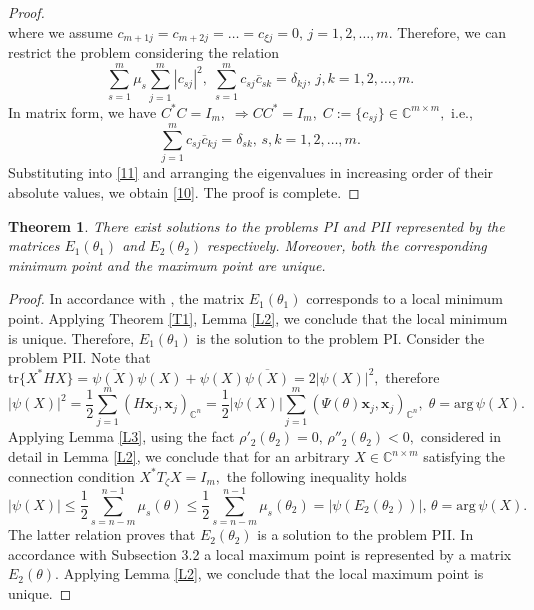 \documentclass[a4paper,twoside,12pt]{article}
\newtheorem{theorem}{Theorem}
\begin{document}
\begin{proof}
$$$$
where we assume  $c_{m+1j}=c_{m+2j}=\ldots=c_{\xi j}=0,\,j=1,2,\ldots,m.$
Therefore, we can restrict the problem considering the   relation
\begin{equation}\label{11}
      \sum\limits_{s=1}^{m}\mu_{s} \sum\limits_{j=1}^{m}  |c_{sj }|^{2}, \;
\sum\limits_{s=1}^{m} c _{sj }\overline{c }_{sk }  =\delta_{kj},\,j,k=1,2,\ldots,m.
\end{equation}
 In  matrix form, we have
$
 C ^{\ast} C =I_{m},\;  \Rightarrow  C C ^{\ast}=I_{m},\;C:=\{c_{sj}\}\in \mathbb{C}^{m\times m},
$
i.e.,
$$
\sum\limits_{j=1}^{m} c _{sj  }\overline{c }_{kj } =\delta_{sk},\,s,k=1,2,\ldots,m.
$$
Substituting   into \eqref{11} and    arranging   the eigenvalues in increasing order of their absolute values, we obtain \eqref{10}. The proof is complete.
\end{proof}

\begin{theorem} There exist  solutions to the   problems PI and  PII represented by the matrices $E_{1}(\theta_{1})$ and $E_{2}(\theta_{2})$ respectively. Moreover, both the corresponding minimum point and the maximum point are unique.
\end{theorem}
\begin{proof}
In accordance with \cite{KABaChu26}, the matrix $E_{1}(\theta_{1})$ corresponds to a local minimum point.   Applying Theorem \ref{T1}, Lemma \ref{L2}, we conclude that the local minimum is unique. Therefore, $E_{1}(\theta_{1})$ is the  solution to the  problem PI.  Consider the  problem PII. Note that
$
\mathrm{tr}\{X^{\ast}HX\}=\overline{\psi(X)}\psi(X) + \psi(X)\overline{\psi(X)}=2|\psi(X)|^{2},
$
therefore
$$
|\psi(X)|^{2}=
\frac{1}{2}\sum\limits_{j=1}^{m}(H\mathbf{x}_{j},\mathbf{x}_{j})_{\mathbb{C}^{n}}=
\frac{1}{2}|\psi(X)| \sum\limits_{j=1}^{m}(\Psi(\theta)\mathbf{x}_{j},\mathbf{x}_{j})_{\mathbb{C}^{n}},\;\theta=\mathrm{arg}\,\psi(X).
$$
Applying Lemma \ref{L3},   using the fact $\rho'_{2}(\theta_{2})=0,\,\rho''_{2}(\theta_{2})<0,$ considered in detail  in Lemma \ref{L2}, we conclude that  for an arbitrary   $X\in \mathbb{C}^{n\times m}$ satisfying the connection condition  $X^{\ast}T_{\zeta}X= I_{m},$ the following inequality holds
$$
|\psi(X)|\leq \frac{1}{2}\sum\limits_{s=n-m }^{n-1}\mu_{s}(\theta)\leq \frac{1}{2}\sum\limits_{s=n-m }^{n-1}\mu_{s}(\theta_{2})  =|\psi(E_{2}(\theta_{2}))|,\,\theta=\mathrm{arg}\,\psi(X).
$$
The latter relation proves that $E_{2}(\theta_{2})$ is a solution to the  problem PII. In accordance with  Subsection 3.2 \cite{KABaChu26} a local maximum point is represented by a matrix  $E_{2}(\theta).$  Applying   Lemma \ref{L2}, we conclude that the local maximum point  is unique.
\end{proof}
\end{document}
